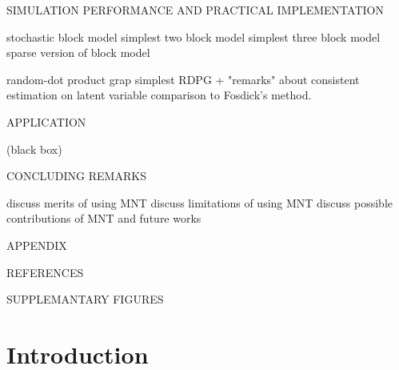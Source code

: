 \documentclass[12pt]{article}
\theoremstyle{definition}
\begin{document}
\begin{outline}[enumerate]
\1 SIMULATION PERFORMANCE AND PRACTICAL IMPLEMENTATION

	\2 stochastic block model
		\3 simplest two block model
		\3 simplest three block model
		\3 sparse version of block model

	\2 random-dot product grap
		\3 simplest RDPG + "remarks" about consistent estimation on latent variable
		\3 comparison to Fosdick's method.	


\1 APPLICATION

(black box)


\1 CONCLUDING REMARKS

	\2 discuss merits of using MNT 
	\2 discuss limitations of using MNT
	\2 discuss possible contributions of MNT and future works



\1 APPENDIX


\1 REFERENCES


\1 SUPPLEMANTARY FIGURES

\end{outline}


\newpage
\tableofcontents


\newpage

\section{Introduction}
\end{document}
